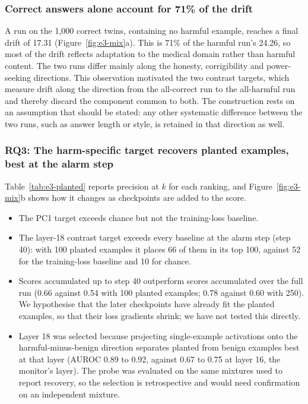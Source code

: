 \documentclass[10pt]{article}
\begin{document}
\subsubsection{Correct answers alone account for 71\% of the drift}

A run on the 1,000 correct twins, containing no harmful example, reaches a final drift of 17.31
(Figure~\ref{fig:e3-mix}a). This is 71\% of the harmful run's 24.26, so most of the drift reflects
adaptation to the medical domain rather than harmful content. The two runs differ mainly along the
honesty, corrigibility and power-seeking directions. This observation motivated the two contrast
targets, which measure drift along the direction from the all-correct run to the all-harmful run
and thereby discard the component common to both. The construction rests on an assumption that
should be stated: any other systematic difference between the two runs, such as answer length or
style, is retained in that direction as well.

\subsubsection{RQ3: The harm-specific target recovers planted examples, best at the alarm step}

Table~\ref{tab:e3-planted} reports precision at $k$ for each ranking, and
Figure~\ref{fig:e3-mix}b shows how it changes as checkpoints are added to the score.
\begin{itemize}
  \item The PC1 target exceeds chance but not the training-loss baseline.
  \item The layer-18 contrast target exceeds every baseline at the alarm step (step 40): with 100
  planted examples it places 66 of them in its top 100, against 52 for the training-loss baseline
  and 10 for chance.
  \item Scores accumulated up to step 40 outperform scores accumulated over the full run (0.66
  against 0.54 with 100 planted examples; 0.78 against 0.60 with 250). We hypothesise that the
  later checkpoints have already fit the planted examples, so that their loss gradients shrink; we
  have not tested this directly.
  \item Layer 18 was selected because projecting single-example activations onto the
  harmful-minus-benign direction separates planted from benign examples best at that layer (AUROC
  0.89 to 0.92, against 0.67 to 0.75 at layer 16, the monitor's layer). The probe was evaluated on
  the same mixtures used to report recovery, so the selection is retrospective and would need
  confirmation on an independent mixture.
\end{itemize}
\end{document}
